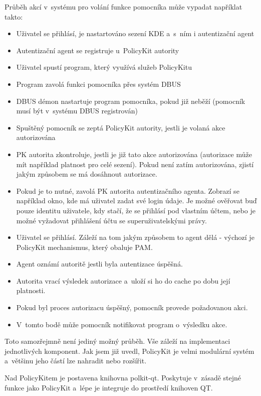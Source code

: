 Průběh akcí v~systému pro volání funkce pomocníka může vypadat napříklat takto:
\begin{itemize}
\item Uživatel se přihlásí, je nastartováno sezení KDE a~s~ním i autentizační
agent
\item Autentizační agent se registruje u~PolicyKit autority
\item Uživatel spustí program, který využívá služeb PolicyKitu
\item Program zavolá funkci pomocníka přes systém DBUS
\item DBUS démon nastartuje program pomocníka, pokud již neběží (pomocník musí
být v~systému DBUS registrován)
\item Spuštěný pomocník se zeptá PolicyKit autority, jestli je volaná akce
autorizována
\item PK autorita zkontroluje, jestli je již tato akce autorizována (autorizace
může mít například platnost pro celé sezení). Pokud není zatím autorizována,
zjistí jakým způsobem se má dosáhnout autorizace.
\item Pokud je to nutné, zavolá PK autorita autentizačního agenta. Zobrazí se
například okno, kde má uživatel zadat své login údaje. Je možné ověřovat buď
pouze identitu uživatele, kdy stačí, že se přihlásí pod vlastním účtem,
nebo je možné vyžadovat přihlášení účtu se superuživatelskými právy.
\item Uživatel se přihlásí. Záleží na tom jakým způsobem to agent dělá - výchozí
je PolicyKit mechanismus, který obaluje PAM.
\item Agent oznámí autoritě jestli byla autentizace úspěšná.
\item Autorita vrací výsledek autorizace a~uloží si ho do cache po dobu její
platnosti.
\item Pokud byl proces autorizacu úspěšný, pomocník provede požadovanou akci.
\item V~tomto bodě může pomocník notifikovat program o~výsledku akce.
\end{itemize}

Toto samozřejmně není jediný možný průběh. Vše záleží na implementaci
jednotlivých komponent. Jak jsem již uvedl, PolicyKit je velmi modulární systém
a~většinu jeho částí lze nahradit nebo rozšířit.

Nad PolicyKitem je postavena knihovna polkit-qt. Poskytuje v~zásadě stejné
funkce jako PolicyKit a~lépe je integruje do prostředí knihoven QT. %


